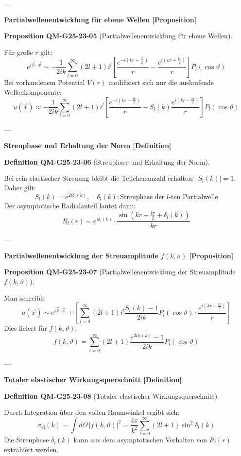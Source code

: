 \documentclass[10pt, letterpaper]{article}
\newcommand{\CustomHeading}[3]{%
  \par\medskip\noindent%
  \textbf{#1 #2} \textnormal{(#3)}.\enskip%
}
\newenvironment{DEF}[2]{\begin{unitbox}\CustomHeading{Definition}{#1}{#2}}{\end{unitbox}}
\newenvironment{PROP}[2]{\begin{unitbox}\CustomHeading{Proposition}{#1}{#2}}{\end{unitbox}}
\begin{document}
---

\textbf{Partialwellenentwicklung für ebene Wellen [Proposition]}

\begin{PROP}{QM-G25-23-05}{Partialwellenentwicklung für ebene Wellen}
Für große $r$ gilt:
\[
e^{i \vec{k} \cdot \vec{x}} \sim -\frac{1}{2ik} \sum_{l=0}^{\infty} (2l+1) i^l \left[
\frac{e^{-i(kr - \frac{l\pi}{2})}}{r}
- \frac{e^{i(kr - \frac{l\pi}{2})}}{r}
\right] P_l(\cos \vartheta)
\]
Bei vorhandenem Potential $V(r)$ modifiziert sich nur die auslaufende Wellenkomponente:
\[
u(\vec{x}) \approx -\frac{1}{2ik} \sum_{l=0}^{\infty} (2l+1) i^l \left[
\frac{e^{-i(kr - \frac{l\pi}{2})}}{r}
- S_l(k) \frac{e^{i(kr - \frac{l\pi}{2})}}{r}
\right] P_l(\cos \vartheta)
\]
\end{PROP}

---

\textbf{Streuphase und Erhaltung der Norm [Definition]}

\begin{DEF}{QM-G25-23-06}{Streuphase und Erhaltung der Norm}
Bei rein elastischer Streuung bleibt die Teilchenanzahl erhalten: $|S_l(k)| = 1$. Daher gilt:
\[
S_l(k) = e^{2i\delta_l(k)}, \quad \delta_l(k): \text{Streuphase der $l$-ten Partialwelle}
\]
Der asymptotische Radialanteil lautet dann:
\[
R_l(r) \sim e^{i\delta_l(k)} \cdot \frac{\sin(kr - \frac{l\pi}{2} + \delta_l(k))}{kr}
\]
\end{DEF}

---

\textbf{Partialwellenentwicklung der Streuamplitude $f(k, \vartheta)$ [Proposition]}

\begin{PROP}{QM-G25-23-07}{Partialwellenentwicklung der Streuamplitude $f(k, \vartheta)$}
Man schreibt:
\[
u(\vec{x}) \sim e^{i \vec{k} \cdot \vec{x}} + \left[
\sum_{l=0}^{\infty} (2l+1) i^l \frac{S_l(k) - 1}{2ik} P_l(\cos \vartheta) \cdot \frac{e^{i(kr - \frac{l\pi}{2})}}{r}
\right]
\]
Dies liefert für $f(k, \vartheta)$:
\[
f(k, \vartheta) = \sum_{l=0}^\infty (2l+1) \frac{e^{2i\delta_l(k)} - 1}{2ik} P_l(\cos \vartheta)
\]
\end{PROP}

---

\textbf{Totaler elastischer Wirkungsquerschnitt [Definition]}

\begin{DEF}{QM-G25-23-08}{Totaler elastischer Wirkungsquerschnitt}
Durch Integration über den vollen Raumwinkel ergibt sich:
\[
\sigma_{\text{el}}(k) = \int d\Omega \, |f(k, \vartheta)|^2 = \frac{4\pi}{k^2} \sum_{l=0}^\infty (2l+1) \sin^2 \delta_l(k)
\]
Die Streuphase $\delta_l(k)$ kann aus dem asymptotischen Verhalten von $R_l(r)$ extrahiert werden.
\end{DEF}
\end{document}
